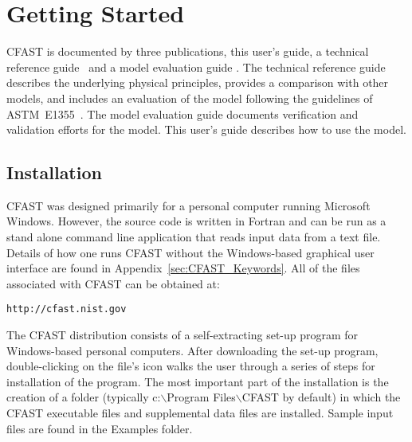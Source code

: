 
\chapter{Getting Started}

CFAST is documented by three publications, this user's guide, a technical reference guide~\cite{CFAST_Tech_Guide_7} and a model evaluation guide \cite{CFAST_Valid_Guide_7}. The technical reference guide describes the underlying physical principles, provides a comparison with other models, and includes an evaluation of the model following the guidelines of ASTM~E1355~\cite{ASTM:E1355}. The model evaluation guide documents verification and validation efforts for the model. This user's guide describes how to use the model.

\section{Installation}

CFAST was designed primarily for a personal computer running Microsoft Windows. However, the source code is written in Fortran and can be run as a stand alone command line application that reads input data from a text file. Details of how one runs CFAST without the Windows-based graphical user interface are found in Appendix~\ref{sec:CFAST_Keywords}. All of the files associated with CFAST can be obtained at:
\begin{lstlisting}
http://cfast.nist.gov
\end{lstlisting}
The CFAST distribution consists of a self-extracting set-up program for Windows-based personal computers. After downloading the set-up program, double-clicking on the file's icon walks the user through a series of steps for installation of the program.  The most important part of the installation is the creation of a folder (typically {\ct c:$\backslash$Program Files$\backslash$CFAST} by default) in which the CFAST executable files and supplemental data files are installed.  Sample input files are found in the {\ct Examples} folder.

